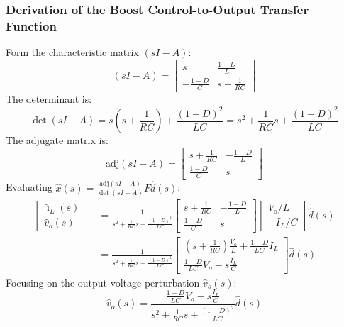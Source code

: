 \subsubsection{Derivation of the Boost Control-to-Output Transfer Function}
Form the characteristic matrix $(s I - A)$:
\begin{equation}
(s I - A) = \begin{bmatrix} s & \frac{1-D}{L} \\ -\frac{1-D}{C} & s + \frac{1}{RC} \end{bmatrix}
\end{equation}
The determinant is:
\begin{equation}
\det(s I - A) = s\left(s + \frac{1}{RC}\right) + \frac{(1-D)^2}{LC} = s^2 + \frac{1}{RC} s + \frac{(1-D)^2}{LC}
\end{equation}
The adjugate matrix is:
\begin{equation}
\text{adj}(s I - A) = \begin{bmatrix} s + \frac{1}{RC} & -\frac{1-D}{L} \\ \frac{1-D}{C} & s \end{bmatrix}
\end{equation}
Evaluating $\hat{x}(s) = \frac{\text{adj}(s I - A)}{\det(s I - A)} F \hat{d}(s)$:
\begin{equation}
\begin{aligned}
\begin{bmatrix} \hat{\imath}_L(s) \\ \hat{v}_o(s) \end{bmatrix} &= \frac{1}{s^2 + \frac{1}{RC} s + \frac{(1-D)^2}{LC}} \begin{bmatrix} s + \frac{1}{RC} & -\frac{1-D}{L} \\ \frac{1-D}{C} & s \end{bmatrix} \begin{bmatrix} V_o/L \\ -I_L/C \end{bmatrix} \hat{d}(s) \\
&= \frac{1}{s^2 + \frac{1}{RC} s + \frac{(1-D)^2}{LC}} \begin{bmatrix} \left(s + \frac{1}{RC}\right)\frac{V_o}{L} + \frac{1-D}{LC} I_L \\ \frac{1-D}{LC} V_o - s \frac{I_L}{C} \end{bmatrix} \hat{d}(s)
\end{aligned}
\end{equation}
Focusing on the output voltage perturbation $\hat{v}_o(s)$:
\begin{equation}
\hat{v}_o(s) = \frac{\frac{1-D}{LC} V_o - s \frac{I_L}{C}}{s^2 + \frac{1}{RC} s + \frac{(1-D)^2}{LC}} \hat{d}(s)
\end{equation}
